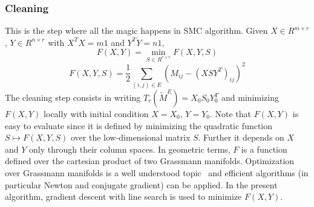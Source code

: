 \subsubsection{Cleaning}
This is the step where all the magic happens in SMC algorithm. Given $X \in R^{m\times r}$, $Y \in R^{n\times r}$ with $X^TX = m1$ and $Y^TY = n1$, 
\begin{equation}
F(X,Y) = \min_{S \in R^{r \times r}} F(X,Y,S)
\end{equation}
\begin{equation}
F(X,Y,S) = \frac{1}{2} \sum\limits_{(i,j) \in E} (M_{ij} - (XSY^T)_{ij})^2
\end{equation}
The cleaning step consists in writing $T_r(\widetilde{M}^E) = X_0S_0Y_0^T$ and minimizing $F(X, Y)$ locally with initial
condition $X = X_0$, $Y = Y_0$. Note that $F(X, Y)$ is easy to evaluate since it is defined by minimizing the quadratic function
$S \mapsto F(X, Y, S)$ over the low-dimensional matrix $S$. Further it depends on $X$ and $Y$ only through
their column spaces. In geometric terms, $F$ is a function defined over the cartesian product of two Grassmann manifolds. Optimization over Grassmann manifolds is a well understood topic~\cite{edelman1998geometry} and efficient algorithms (in particular Newton and conjugate gradient) can be applied. In the present algorithm, gradient descent with line search is used to minimize $F(X, Y)$.